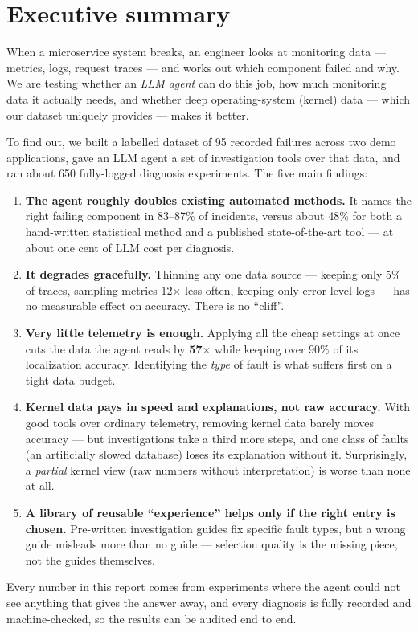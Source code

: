 \section*{Executive summary}

When a microservice system breaks, an engineer looks at monitoring data --- metrics,
logs, request traces --- and works out which component failed and why. We are testing
whether an \emph{LLM agent} can do this job, how much monitoring data it actually
needs, and whether deep operating-system (kernel) data --- which our dataset uniquely
provides --- makes it better.

To find out, we built a labelled dataset of 95 recorded failures across two demo
applications, gave an LLM agent a set of investigation tools over that data, and ran
about 650 fully-logged diagnosis experiments. The five main findings:

\begin{enumerate}
  \item \textbf{The agent roughly doubles existing automated methods.} It names the
  right failing component in 83--87\% of incidents, versus about 48\% for both a
  hand-written statistical method and a published state-of-the-art tool --- at about
  one cent of LLM cost per diagnosis.
  \item \textbf{It degrades gracefully.} Thinning any one data source --- keeping only
  5\% of traces, sampling metrics 12$\times$ less often, keeping only error-level logs
  --- has no measurable effect on accuracy. There is no ``cliff''.
  \item \textbf{Very little telemetry is enough.} Applying all the cheap settings at
  once cuts the data the agent reads by \textbf{57$\times$} while keeping over 90\% of
  its localization accuracy. Identifying the \emph{type} of fault is what suffers
  first on a tight data budget.
  \item \textbf{Kernel data pays in speed and explanations, not raw accuracy.}
  With good tools over ordinary telemetry, removing kernel data barely moves accuracy
  --- but investigations take a third more steps, and one class of faults (an
  artificially slowed database) loses its explanation without it. Surprisingly,
  a \emph{partial} kernel view (raw numbers without interpretation) is worse than
  none at all.
  \item \textbf{A library of reusable ``experience'' helps only if the right entry is
  chosen.} Pre-written investigation guides fix specific fault types, but a wrong
  guide misleads more than no guide --- selection quality is the missing piece, not
  the guides themselves.
\end{enumerate}

Every number in this report comes from experiments where the agent could not see
anything that gives the answer away, and every diagnosis is fully recorded and
machine-checked, so the results can be audited end to end.
